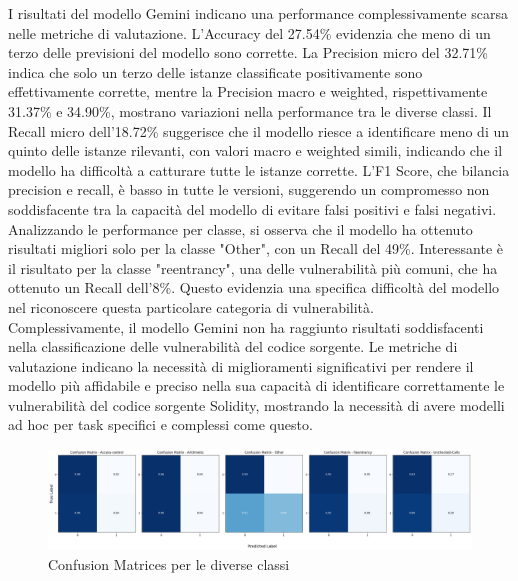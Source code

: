 \documentclass[../../Thesis.tex]{subfiles}
\begin{document}
    I risultati del modello Gemini indicano una performance complessivamente scarsa nelle metriche di valutazione. L'Accuracy del 27.54\% evidenzia che meno di un terzo delle previsioni del modello sono corrette. La Precision micro del 32.71\% indica che solo un terzo delle istanze classificate positivamente sono effettivamente corrette, mentre la Precision macro e weighted, rispettivamente 31.37\% e 34.90\%, mostrano variazioni nella performance tra le diverse classi. Il Recall micro dell'18.72\% suggerisce che il modello riesce a identificare meno di un quinto delle istanze rilevanti, con valori macro e weighted simili, indicando che il modello ha difficoltà a catturare tutte le istanze corrette. L'F1 Score, che bilancia precision e recall, è basso in tutte le versioni, suggerendo un compromesso non soddisfacente tra la capacità del modello di evitare falsi positivi e falsi negativi.\\
    Analizzando le performance per classe, si osserva che il modello ha ottenuto risultati migliori solo per la classe "Other", con un Recall del 49\%. Interessante è il risultato per la classe "reentrancy", una delle vulnerabilità più comuni, che ha ottenuto un Recall dell'8\%. Questo evidenzia una specifica difficoltà del modello nel riconoscere questa particolare categoria di vulnerabilità.\\
    Complessivamente, il modello Gemini non ha raggiunto risultati soddisfacenti nella classificazione delle vulnerabilità del codice sorgente. Le metriche di valutazione indicano la necessità di miglioramenti significativi per rendere il modello più affidabile e preciso nella sua capacità di identificare correttamente le vulnerabilità del codice sorgente Solidity, mostrando la necessità di avere modelli ad hoc per task specifici e complessi come questo.
\begin{figure}[h!]
    \centering
    \includegraphics[width=1.10\textwidth]{../../img/CF-Gemini.png}
    \caption{Confusion Matrices per le diverse classi}
\end{figure}
\end{document}
